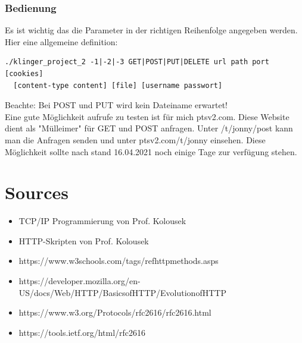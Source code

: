 \documentclass{article}
\begin{document}
\subsubsection{Bedienung}
Es ist wichtig das die Parameter in der richtigen Reihenfolge angegeben werden. Hier eine allgemeine definition:
\begin{verbatim}
./klinger_project_2 -1|-2|-3 GET|POST|PUT|DELETE url path port [cookies] 
  [content-type content] [file] [username passwort] 
\end{verbatim}
Beachte: Bei POST und PUT wird kein Dateiname erwartet!
\\
Eine gute Möglichkeit aufrufe zu testen ist für mich ptsv2.com. Diese Website dient als "Mülleimer" für GET und POST anfragen. Unter /t/jonny/post kann man die Anfragen senden und unter ptsv2.com/t/jonny einsehen. Diese Möglichkeit sollte nach stand 16.04.2021 noch einige Tage zur verfügung stehen. 


\section{Sources}
\begin{itemize}
  \item TCP/IP Programmierung von Prof. Kolousek
  \item HTTP-Skripten von Prof. Kolousek
  \item https://www.w3schools.com/tags/ref\textunderscore httpmethods.asps
  \item https://developer.mozilla.org/en-US/docs/Web/HTTP/Basics\textunderscore of\textunderscore HTTP/Evolution\textunderscore of\textunderscore HTTP
  \item https://www.w3.org/Protocols/rfc2616/rfc2616.html
  \item https://tools.ietf.org/html/rfc2616
\end{itemize}
\end{document}
